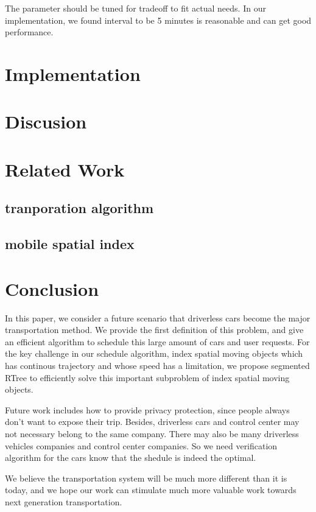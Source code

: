 \documentclass{vldb}
\begin{document}
The parameter should be tuned for tradeoff to fit actual needs.
In our implementation, we found interval to be 5 minutes is reasonable and can get good performance.

\section{Implementation}
\label{implementation}

\section{Discusion}
\label{discussion}

\section{Related Work}
\label{related_work}
\subsection{tranporation algorithm}
\subsection{mobile spatial index}

\section{Conclusion}
\label{conclusion}
In this paper, we consider a future scenario that driverless cars become the major transportation method.
We provide the first definition of this problem,
and give an efficient algorithm to schedule this large amount of cars and user requests.
For the key challenge in our schedule algorithm,
index spatial moving objects which has continous trajectory and whose speed has a limitation,
we propose segmented RTree to efficiently solve this important subproblem of index spatial moving objects.

Future work includes how to provide privacy protection,
since people always don't want to expose their trip.
Besides, driverless cars and control center may not necessary belong to the same company.
There may also be many driverless vehicles companies and control center companies.
So we need verification algorithm for the cars know that the shedule is indeed the optimal.

We believe the transportation system will be much more different than it is today,
and we hope our work can stimulate much more valuable work towards next generation transportation.

\balance


\end{document}
